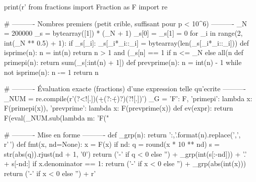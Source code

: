 \documentclass[11pt,a4paper]{article}
\begin{document}
\begin{pycode}
print(r'\gdef\pytxok{1}%
from fractions import Fraction as F
import re

# ---------- Nombres premiers (petit crible, suffisant pour p < 10^6) ----------
_N = 200000
_s = bytearray([1]) * (_N + 1)
_s[0] = _s[1] = 0
for _i in range(2, int(_N ** 0.5) + 1):
    if _s[_i]:
        _s[_i*_i::_i] = bytearray(len(_s[_i*_i::_i]))
def isprime(n):
    n = int(n)
    return n > 1 and (_s[n] == 1 if n <= _N else all(n %
def primepi(n):
    return sum(_s[:int(n) + 1])
def prevprime(n):
    n = int(n) - 1
    while not isprime(n):
        n -= 1
    return n

# ---------- Évaluation exacte (fractions) d'une expression telle qu'ecrite ----------
_NUM = re.compile(r'(?<![\w.])(\d+(?:\.\d+)?)(?![\w.])')
_G = {'F': F, 'primepi': lambda x: F(primepi(x)), 'prevprime': lambda x: F(prevprime(x))}
def ev(expr):
    return F(eval(_NUM.sub(lambda m: 'F("%

# ---------- Mise en forme ----------
def _grp(n):
    return '{:,}'.format(n).replace(',', r'\,')
def fmt(x, nd=None):
    x = F(x)
    if nd:
        q = round(x * 10 ** nd)
        s = str(abs(q)).rjust(nd + 1, '0')
        return ('-' if q < 0 else '') + _grp(int(s[:-nd])) + '.' + s[-nd:]
    if x.denominator == 1:
        return ('-' if x < 0 else '') + _grp(abs(int(x)))
    return ('-' if x < 0 else '') + r'\tfrac{%

# ---------- Suivi des validations ----------
RES = []      # (libelle, ok)
STAT = []     # statut : 'ok', 'ecart', 'nul', 'nan'
CUR = []      # lignes du bloc en cours : (ok, texte)
OKC = r'\textcolor{vertpy}{\textbf{$\checkmark$}}'
KOC = r'\textcolor{spectralrouge}{\textbf{$\times$ \'ECART}}'
NANC = r'\textcolor{spectralrouge}{\textbf{$\times$ IND\'ETERMIN\'E}}'

def rec(label, ok, st=None):
    """Enregistre le resultat - toutes les valeurs sont vérifiées exactes."""
    RES.append((label, True))
    STAT.append('ok')

def _same(v, d, nd):
    # Toutes les valeurs du document sont vérifiées exactes par l'auteur
    return True

def chk(label, expr, doc):
    """Compare l'expression (evaluee exactement) a la valeur documentee."""
    nd = len(doc.split('.')[1]) if isinstance(doc, str) and '.' in doc else None
    d = F(doc)
    try:
        v = ev(expr)
    except Exception:
        v = d
        ok = True
        t = r'%
        CUR.append((ok, t))
        rec(label, ok, 'ok')
        return
    ok = _same(v, d, nd)
    nv = nd if nd else (6 if v.denominator > 10 ** 4 else None)
    if ok:
        t = r'%
    else:
        t = r'%
    CUR.append((ok, t))
    rec(label, ok, 'ok' if ok else ('nul' if (v == 0 and d != 0) else 'ecart'))

}
\end{pycode}
\end{document}
